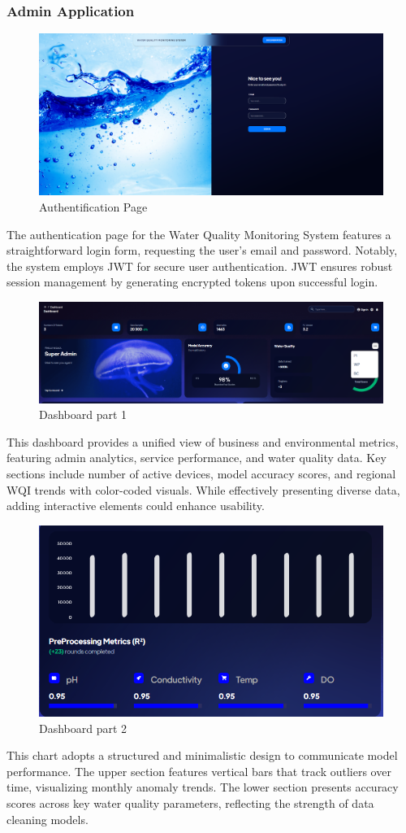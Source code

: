 \subsubsection{Admin Application}
\begin{figure}[H]
    \centering
    \includegraphics[width=0.75\linewidth]{Figures/admin1.png}
    \caption{Authentification Page}
    \label{fig:enter-label}
\end{figure}
The authentication page for the Water Quality Monitoring System features a straightforward login form, requesting the user's email and password. Notably, the system employs JWT  for secure user authentication. JWT ensures robust session management by generating encrypted tokens upon successful login.
\begin{figure}[H]
    \centering
    \includegraphics[width=0.75\linewidth]{Figures/admin2.png}
    \caption{Dashboard part 1}
    \label{fig:enter-label}
\end{figure}
This dashboard provides a unified view of business and environmental metrics, featuring admin analytics, service performance, and water quality data. Key sections include  number of active devices, model accuracy scores, and regional WQI trends with color-coded visuals. While effectively presenting diverse data, adding interactive elements could enhance usability.
\begin{figure}[H]
    \centering
    \includegraphics[width=0.75\linewidth]{Figures/admin3.png}
    \caption{Dashboard part 2}
    \label{fig:enter-label}
\end{figure}
This chart adopts a structured and minimalistic design to communicate model performance. The upper section features vertical bars that track outliers over time, visualizing monthly anomaly trends. The lower section presents accuracy scores across key water quality parameters, reflecting the strength of data cleaning models.

